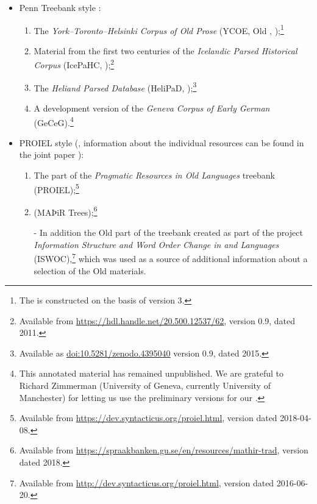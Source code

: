 \documentclass[output=paper,colorlinks,citecolor=brown]{langscibook}
\begin{document}
\begin{sloppypar}
\begin{itemize}
\item Penn Treebank style \citep{marcus-etal:1993, taylor:2003}:
  \begin{enumerate}[series=sources]
  \item The \textit{York--Toronto--Helsinki Corpus of Old  Prose}
    (YCOE, Old , \citealp{YCOE});\footnote{The  is constructed on the basis of version 3.}
  \item Material from the first two centuries of the \textit{Icelandic
    Parsed Historical Corpus} (IcePaHC, \citealp{IcePaHC,rognvaldsson-etal:2012});\footnote{Available from \url{https://hdl.handle.net/20.500.12537/62}, version 0.9, dated 2011.}
  \item The \textit{Heliand Parsed Database} (HeliPaD,
    \citealp{Walkden15, Walkden16});\footnote{Available as \href{https://doi.org/10.5281/zenodo.4395040}{doi:10.5281/zenodo.4395040} version 0.9, dated 2015.}
  \item A development version of the \textit{Geneva Corpus of Early
    German} (GeCeG).\footnote{This annotated material has remained
  unpublished. We are grateful to Richard Zimmerman (University of
  Geneva, currently University of Manchester) for letting us use the
  preliminary versions for our .}
  \end{enumerate}
\item PROIEL style (\citealp{haug-johndal:2008}, information about the
  individual resources can be found in the joint paper
  \citealp{eckhoff-etal:2018}):
  \begin{enumerate}[resume=sources]
  \item The  part of the \textit{Pragmatic Resources in Old
     Languages} treebank
    (PROIEL);\footnote{Available from \url{https://dev.syntacticus.org/proiel.html},
    version dated 2018-04-08.}
    \item {} (MAÞiR Trees);\footnote{Available from \url{https://spraakbanken.gu.se/en/resources/mathir-trad},
      version dated 2018.}
    \item[-\phantom{.}] In addition the Old  part of the
      treebank created as part of the project \textit{Information Structure
      and Word Order Change in  and  Languages}
      (ISWOC),\footnote{Available from
      \url{http://dev.syntacticus.org/proiel.html}, version dated
      2016-06-20.} which was used as a source of additional information
      about a selection of the Old   materials.
  \end{enumerate}
\end{itemize}
\end{sloppypar}
\end{document}
